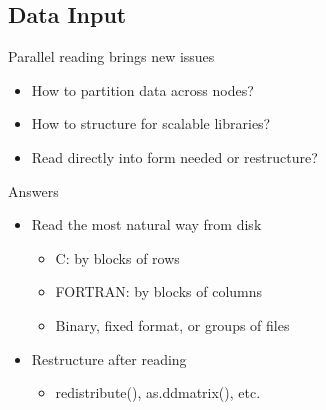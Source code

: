 \subsection{Data Input}
\makesubcontentsslidessec

\begin{frame}
  \begin{block}{Parallel reading brings new issues}\pause
    \begin{itemize}
    \item How to partition data across nodes?
    \item How to structure for scalable libraries?
    \item Read directly into form needed or restructure?
    \end{itemize}
  \end{block}
  \begin{block}{Answers}\pause
    \begin{itemize}
    \item Read the most natural way from disk
      \begin{itemize}
      \item C: by blocks of rows
      \item FORTRAN: by blocks of columns
      \item Binary, fixed format, or groups of files
      \end{itemize}
    \item Restructure after reading
      \begin{itemize}
      \item redistribute(), as.ddmatrix(), etc.
      \end{itemize}
    \end{itemize}
  \end{block}
\end{frame}

